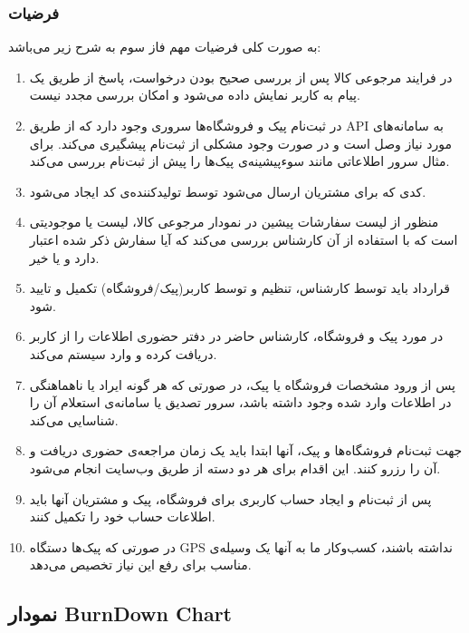 \documentclass[]{article}
\begin{document}
\subsubsection{فرضیات}\label{ux641ux631ux636ux6ccux627ux62a}

به صورت کلی فرضیات مهم فاز سوم به شرح زیر می‌باشد:

\begin{enumerate}
\def\labelenumi{\arabic{enumi})}
\item
  در فرایند مرجوعی کالا پس از بررسی صحیح بودن درخواست، پاسخ از طریق یک
  پیام به کاربر نمایش داده می‌شود و امکان بررسی مجدد نیست.
\item
  در ثبت‌نام پیک و فروشگاه‌ها سروری وجود دارد که از طریق API به
  سامانه‌های مورد نیاز وصل است و در صورت وجود مشکلی از ثبت‌نام پیشگیری
  می‌کند. برای مثال سرور اطلاعاتی مانند سوءپیشینه‌ی پیک‌ها را پیش از
  ثبت‌نام بررسی می‌کند.
\item
  کدی که برای مشتریان ارسال می‌شود توسط تولید‌کننده‌ی کد ایجاد می‌شود.
\item
  منظور از لیست سفارشات پیشین در نمودار مرجوعی کالا، لیست یا موجودیتی
  است که با استفاده از آن کارشناس بررسی می‌کند که آیا سفارش ذکر شده
  اعتبار دارد و یا خیر.
\item
  قرارداد باید توسط کارشناس، تنظیم و توسط کاربر(پیک/فروشگاه) تکمیل و
  تایید شود.
\item
  در مورد پیک و فروشگاه، کارشناس حاضر در دفتر حضوری اطلاعات را از کاربر
  دریافت کرده و وارد سیستم می‌کند.
\item
  پس از ورود مشخصات فروشگاه یا پیک، در صورتی که هر گونه ایراد یا
  ناهماهنگی در اطلاعات وارد شده وجود داشته باشد، سرور تصدیق یا سامانه‌ی
  استعلام آن را شناسایی می‌کند.
\item
  جهت ثبت‌نام فروشگاه‌ها و پیک، آنها ابتدا باید یک زمان مراجعه‌ی حضوری
  دریافت و آن را رزرو کنند. این اقدام برای هر دو دسته از طریق وب‌سایت
  انجام می‌شود.
\item
  پس از ثبت‌نام و ایجاد حساب کاربری برای فروشگاه، پیک و مشتریان آنها
  باید اطلاعات حساب خود را تکمیل کنند.
\item
  در صورتی که پیک‌ها دستگاه GPS نداشته باشند، کسب‌وکار ما به آنها یک
  وسیله‌ی مناسب برای رفع این نیاز تخصیص می‌دهد.
\end{enumerate}

\subsection{نمودار BurnDown
Chart}\label{ux646ux645ux648ux62fux627ux631-burndown-chart}
\end{document}
